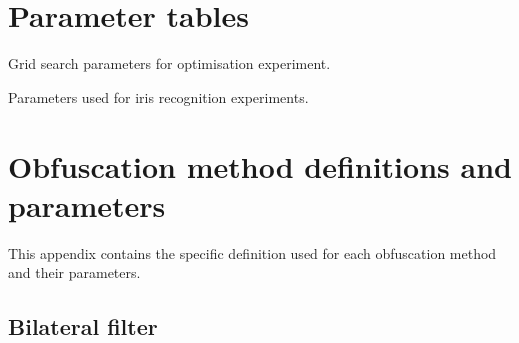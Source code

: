 \appendix
\chapter{Parameter tables}
\begin{table}[]
    \centering

    

    \caption{Grid search parameters for optimisation experiment.}
    \label{tab:param-recognition}
\end{table}

\begin{table}
	
	\caption{Parameters used for iris recognition experiments.}\label{tab:param-recognition}
\end{table}

\chapter{Obfuscation method definitions and parameters}
This appendix contains the specific definition used for each obfuscation method and their parameters.

\section{Bilateral filter}